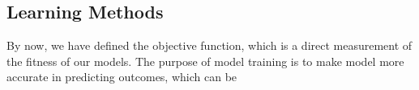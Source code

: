 \subsection {Learning Methods}
By now, we have defined the objective function, which is a direct measurement of the fitness of our models. The purpose of model training is to make model more accurate in predicting outcomes, which can be 